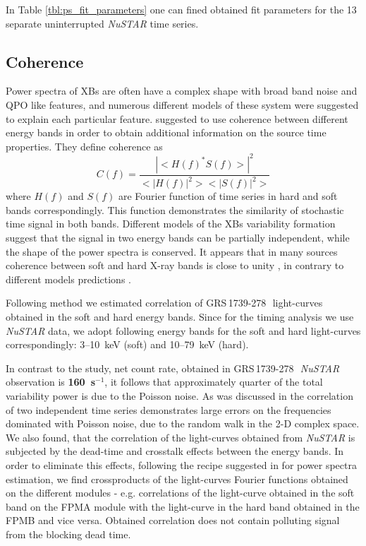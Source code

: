 \documentclass[a4paper,fleqn,usenatbib]{mnras}
\def\grs{{GRS\,1739-278\,}}
\begin{document}
\begin{table}
In Table \ref{tbl:ps_fit_parameters} one can fined obtained fit parameters for the 13 separate uninterrupted {\it NuSTAR} time series.

\subsection{Coherence}

    Power spectra of XBs are often have a complex shape with broad band noise and QPO like features, and numerous different models of these system were suggested to explain each particular feature. 
\citep{vaughan97} suggested to use coherence between different energy bands in order to obtain additional information on the source time properties. 
They define coherence as 
\begin{equation}
    C(f) = \frac{|<H(f)^*S(f)>|^2}{<|H(f)|^2><|S(f)|^2>}
    \label{eq:nowak_coh}
\end{equation}
where $H(f)$ and $S(f)$ are Fourier function of time series in hard and soft bands correspondingly. 
This function demonstrates the similarity of stochastic time signal in both bands. 
Different models of the XBs variability formation suggest that the signal in two energy bands can be partially independent, while the shape of the power spectra is conserved.
It appears that in many sources coherence between soft and hard X-ray bands is close to unity \citep{nowak99, wijnands01, eijden17}, in contrary to different models predictions \citep[see, discussion in][]{vaughan97}.

Following method \citep{nowak99} we estimated correlation of \grs\ light-curves obtained in the soft and hard energy bands. 
Since for the timing analysis we use {\it NuSTAR} data, we adopt following energy bands for the soft and hard light-curves correspondingly: 3--10~keV (soft) and 10--79~keV (hard).

In contrast to the \citep{nowak99} study, net count rate, obtained in \grs\ {\it NuSTAR} observation is {\bf 160~s$^{-1}$}, it follows that approximately quarter of the total variability power is due to the Poisson noise. 
As was discussed in \citep{nowak99} the correlation of two independent time series demonstrates large errors on the frequencies dominated with Poisson noise, due to the random walk in the 2-D complex space.
We also found, that the correlation of the light-curves obtained from {\it NuSTAR} is subjected by the dead-time and crosstalk effects between the energy bands.
In order to eliminate this effects, following the recipe suggested in \cite{2015ApJ...800..109B} for power spectra estimation, we find crossproducts of the light-curves Fourier functions obtained on the different modules - e.g. correlations of the light-curve obtained in the soft band on the FPMA module with the light-curve in the hard band obtained in the FPMB and vice versa.
Obtained correlation does not contain polluting signal from the blocking dead time. 


\end{table}
\end{document}
